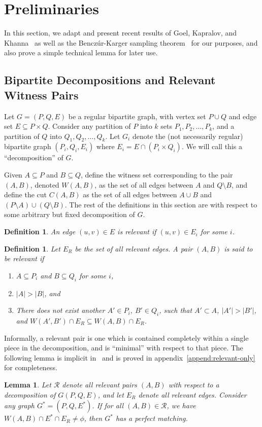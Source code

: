 \documentclass[11pt]{article}
\newtheorem{lemma}[theorem]{Lemma}
\newtheorem{definition}[theorem]{Definition}
\newcommand{\coll}{{\mathcal R}}
\begin{document}
\section{Preliminaries}
\label{sec:prelim}

In this section, we adapt and present recent results of Goel, Kapralov, and
Khanna~\cite{gkk:rbp08} as well as the Bencz\'{u}r-Karger sampling
theorem~\cite{benczurkarger96} for our purposes, and also prove a simple
technical lemma for later use.
\subsection{Bipartite Decompositions and Relevant Witness Pairs}
\label{sec:define}
Let $G=(P,Q,E)$ be a regular bipartite graph, with vertex set $P\cup Q$ and
edge set $E \subseteq P \times Q$. Consider any partition of $P$ into $k$ sets
$P_1, P_2, \ldots, P_k$, and a partition of $Q$ into $Q_1, Q_2, \ldots,
Q_k$. Let $G_i$ denote the (not necessarily regular) bipartite graph $(P_i,
Q_i, E_i)$ where $E_i = E \cap (P_i \times Q_i)$. We will call this a
``decomposition'' of $G$. 

Given $A\subseteq P$ and $B\subseteq Q$, define the witness set corresponding
to the pair $(A,B)$, denoted $W(A,B)$, as the set of all edges between $A$ and
$Q\setminus B$, and define the cut $C(A,B)$ as the set of all edges between $A
\cup B$ and $(P\setminus A) \cup (Q\setminus B)$. The rest of the definitions
in this section are with respect to some arbitrary but fixed decomposition of
$G$.

\begin{definition}
  An edge $(u,v)\in E$ is relevant if $(u,v)\in E_i$ for some $i$.
\end{definition}

\begin{definition}
  Let $E_R$ be the set of all relevant edges. A pair $(A,B)$ is said to be
  relevant if
  \begin{enumerate}
  \item $A\subseteq P_i$ and $B\subseteq Q_i$ for some $i$,
  \item $|A| > |B|$, and
  \item There does not exist another $A'\in P_i$, $B'\in Q_i$, such that
    $A'\subset A$, $|A'| > |B'|$, and $W(A',B') \cap E_R \subseteq W(A,B) \cap
    E_R$.
  \end{enumerate}
\end{definition}

Informally, a relevant pair is one which is contained completely within a
single piece in the decomposition, and is ``minimal'' with respect to that
piece. The following lemma is implicit in~\cite{gkk:rbp08} and is proved in
appendix~\ref{append:relevant-only} for completeness.
\begin{lemma}
\label{lem:relevant-only}
  Let $\coll$ denote all relevant pairs $(A,B)$ with respect to a
  decomposition of $G(P,Q,E)$, and let $E_R$ denote all relevant edges. Consider any
  graph $G^*=(P,Q,E^*)$. If for all $(A,B) \in \coll$, we have $W(A,B) \cap
  E^* \cap E_R \neq \phi$, then $G^*$ has a perfect matching.
\end{lemma}
\end{document}
